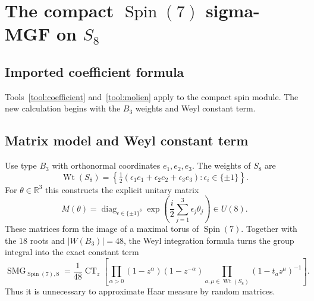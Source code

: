 \documentclass[10pt]{article}
\newcommand{\CT}{\operatorname{CT}}
\newcommand{\SMG}{\operatorname{SMG}}
\begin{document}
\section[The compact Spin(7) sigma-MGF on S8]{The compact $\operatorname{Spin}(7)$ sigma-MGF on $S_8$}\label{proof:spin7}
\begingroup
{}
\providecommand{\Sg}{\SMG}
\renewcommand{\Sg}{\SMG}
\providecommand{\CT}{\operatorname{CT}}
\renewcommand{\CT}{\operatorname{CT}}
\setcounter{theorem}{0}
\setcounter{proposition}{0}
\setcounter{lemma}{0}
\setcounter{corollary}{0}
\setcounter{remark}{0}
\begin{abstract}
For the complexification of the real eight-dimensional spin representation,
we prove the compact Molien--Weyl formula, construct explicit maximal-torus
matrices, and verify all coefficients through total degree four by exact
constant terms.  In the Schur basis the answer is
$1+h_2+h_4+s_{(2,2)}+e_4+O_{\ge6}$.  The coefficient of
$m_{(1,1,1,1)}$ is therefore $4$, with the extra invariant supplied by the
Cayley alternating four-form.
\end{abstract}

\subsection{Imported coefficient formula}
Tools~\ref{tool:coefficient} and~\ref{tool:molien} apply to the compact spin
module. The new calculation begins with the $B_3$ weights and Weyl constant
term.

\subsection{Matrix model and Weyl constant term}
Use type $B_3$ with orthonormal coordinates $e_1,e_2,e_3$.  The weights of
$S_8$ are
\[
 \operatorname{Wt}(S_8)=
 \left\{\tfrac12(\epsilon_1e_1+\epsilon_2e_2+\epsilon_3e_3):
 \epsilon_i\in\{\pm1\}\right\}.
\]
For $\theta\in\mathbb R^3$ this constructs the explicit unitary matrix
\[
 M(\theta)=\operatorname{diag}_{\epsilon\in\{\pm1\}^3}
 \exp\!\left(\frac{i}{2}\sum_{j=1}^3\epsilon_j\theta_j\right)\in U(8).
\]
These matrices form the image of a maximal torus of $\operatorname{Spin}(7)$.
Together with the $18$ roots and $|W(B_3)|=48$, the Weyl integration formula
turns the group integral into the exact constant term
\[
 \boxed{\Sg_{\operatorname{Spin}(7),8}
 =\frac1{48}\CT_z\left[
 \prod_{\alpha>0}(1-z^\alpha)(1-z^{-\alpha})
 \prod_{a,\mu\in\operatorname{Wt}(S_8)}(1-t_a z^\mu)^{-1}
 \right].}
\]
Thus it is unnecessary to approximate Haar measure by random matrices.
\end{document}
